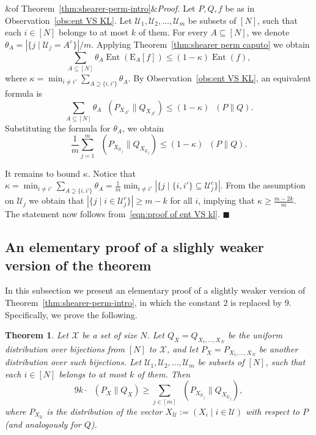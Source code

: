 \documentclass[11pt]{article}
\renewenvironment{proof}[1][]
    {\noindent
       \ifx&#1&{\it Proof.}
       \else{\it Proof ({#1}).}
       \fi}{\hfill $\blacksquare$}
\newtheorem{theorem}{Theorem}[section]
\DeclareMathOperator{\KL}{D_{\text{KL}}}
\DeclareMathOperator{\Ent}{\text{Ent}}
\newcommand{\Qcal}{\mathcal{U}}
\begin{document}
\begin{proof}[of Theorem~\ref{thm:shearer-perm-intro}]
Let $P,Q,f$ be as in Observation~\ref{obs:ent VS KL}. Let $\Qcal_1,\Qcal_2,\ldots,\Qcal_m$ be subsets of $[N]$, such that each $i \in [N]$ belongs to at most $k$ of them. For every $A \subseteq [N]$, we denote $\theta_A = |\{j \mid \Qcal_j = A^c\}|/m$. Applying Theorem~\ref{thm:shearer perm caputo} we obtain
\[
    \sum_{A \subseteq [N]} \theta_A\Ent(\text{E}_A[f]) \le (1-\kappa)\Ent(f),
\]
where $\kappa = \min_{i \ne i'} \sum_{A \supseteq \{i,i'\}} \theta_A$. By Observation~\ref{obs:ent VS KL}, an equivalent formula is
\[
    \sum_{A \subseteq [N]} \theta_A\KL( P_{X_{A^c}} \| Q_{X_{A^c}} ) \le (1-\kappa)\KL(P \| Q).
\]
Substituting the formula for $\theta_A$, we obtain
\begin{equation}\label{eqn:proof of ent VS kl}
    \frac{1}{m} \sum_{j=1}^m \KL( P_{X_{\Qcal_j}} \| Q_{X_{\Qcal_j}} )  \le (1-\kappa)\KL(P \| Q).
\end{equation}

It remains to bound $\kappa$. Notice that $\kappa = \min_{i \ne i'} \sum_{A \supseteq \{i,i'\}} \theta_A = \frac{1}{m} \min_{i \ne i'}|\{j\mid \{i,i'\} \subseteq\Qcal_j^c\}|$. From the assumption on $\Qcal_j$ we obtain that $|\{j\mid i \in\Qcal_j^c\}| \ge m-k$ for all $i$, implying that $\kappa \ge \frac{m-2k}{m}$. The statement now follows from~\eqref{eqn:proof of ent VS kl}.
\end{proof}


\subsection{An elementary proof of a slighly weaker version of the theorem}
\label{sec:sub:weaker-Shearer}

In this subsection we present an elementary proof of a slightly weaker version of Theorem~\ref{thm:shearer-perm-intro}, in which the constant $2$ is replaced by $9$. Specifically, we prove the following. 
\begin{theorem}\label{thm:Shearer-appendix}
    Let $\mathcal{X}$ be a set of size $N$. Let $Q_X = Q_{X_1,\ldots,X_N}$ be the uniform distribution over bijections from $[N]$ to $\mathcal{X}$,
    and let $P_X = P_{X_1,\ldots,X_N}$ be another distribution over such bijections. Let 
    $\Qcal_1,\Qcal_2,\ldots,\Qcal_m$ be subsets of $[N]$, such that each $i \in [N]$ belongs to at most $k$ of them. Then
    $$
    9k \cdot  \KL( P_X \| Q_X ) \geq \sum_{j \in [m]} \KL( P_{X_{\mathcal{U}_j}} \| Q_{X_{\mathcal{U}_j}} ),
    $$
    where $P_{X_{\mathcal{U}}}$ is the distribution of the vector $X_{\mathcal{U}} := \left(X_i \mid i \in \mathcal{U} \right)$ with respect to $P$ (and analogously for $Q$).
\end{theorem}
\end{document}
